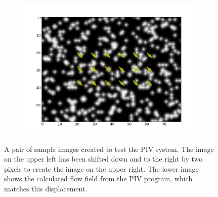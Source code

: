 \documentclass{article}
\begin{document}
\begin{figure}
	\begin{subfigure}[htb]{.7\textwidth}
		\centering
		\includegraphics[width=\textwidth]{../../data/test/x+2_y+2/PIV.png}
	\end{subfigure}
	\caption{A pair of sample images created to test the PIV system. The image on the upper left has been shifted down and to the right by two pixels to create the image on the upper right. The lower image shows the calculated flow field from the PIV program, which matches this displacement.}
	\label{fig:diag_test}
\end{figure}
\end{document}
